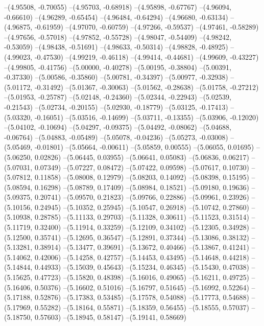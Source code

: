 --(4.95508, -0.70055)
--(4.95703, -0.68918)
--(4.95898, -0.67767)
--(4.96094, -0.66610)
--(4.96289, -0.65454)
--(4.96484, -0.64294)
--(4.96680, -0.63134)
--(4.96875, -0.61959)
--(4.97070, -0.60759)
--(4.97266, -0.59537)
--(4.97461, -0.58289)
--(4.97656, -0.57018)
--(4.97852, -0.55728)
--(4.98047, -0.54409)
--(4.98242, -0.53059)
--(4.98438, -0.51691)
--(4.98633, -0.50314)
--(4.98828, -0.48925)
--(4.99023, -0.47530)
--(4.99219, -0.46118)
--(4.99414, -0.44681)
--(4.99609, -0.43227)
--(4.99805, -0.41756)
--(5.00000, -0.40278)
--(5.00195, -0.38804)
--(5.00391, -0.37330)
--(5.00586, -0.35860)
--(5.00781, -0.34397)
--(5.00977, -0.32938)
--(5.01172, -0.31492)
--(5.01367, -0.30063)
--(5.01562, -0.28638)
--(5.01758, -0.27212)
--(5.01953, -0.25787)
--(5.02148, -0.24360)
--(5.02344, -0.22943)
--(5.02539, -0.21543)
--(5.02734, -0.20155)
--(5.02930, -0.18779)
--(5.03125, -0.17413)
--(5.03320, -0.16051)
--(5.03516, -0.14699)
--(5.03711, -0.13355)
--(5.03906, -0.12020)
--(5.04102, -0.10694)
--(5.04297, -0.09375)
--(5.04492, -0.08062)
--(5.04688, -0.06764)
--(5.04883, -0.05489)
--(5.05078, -0.04236)
--(5.05273, -0.03008)
--(5.05469, -0.01801)
--(5.05664, -0.00611)
--(5.05859, 0.00555)
--(5.06055, 0.01695)
--(5.06250, 0.02826)
--(5.06445, 0.03955)
--(5.06641, 0.05083)
--(5.06836, 0.06217)
--(5.07031, 0.07349)
--(5.07227, 0.08472)
--(5.07422, 0.09598)
--(5.07617, 0.10730)
--(5.07812, 0.11858)
--(5.08008, 0.12979)
--(5.08203, 0.14092)
--(5.08398, 0.15195)
--(5.08594, 0.16298)
--(5.08789, 0.17409)
--(5.08984, 0.18521)
--(5.09180, 0.19636)
--(5.09375, 0.20741)
--(5.09570, 0.21823)
--(5.09766, 0.22886)
--(5.09961, 0.23926)
--(5.10156, 0.24945)
--(5.10352, 0.25945)
--(5.10547, 0.26918)
--(5.10742, 0.27860)
--(5.10938, 0.28785)
--(5.11133, 0.29703)
--(5.11328, 0.30611)
--(5.11523, 0.31514)
--(5.11719, 0.32400)
--(5.11914, 0.33259)
--(5.12109, 0.34102)
--(5.12305, 0.34928)
--(5.12500, 0.35741)
--(5.12695, 0.36547)
--(5.12891, 0.37344)
--(5.13086, 0.38132)
--(5.13281, 0.38914)
--(5.13477, 0.39691)
--(5.13672, 0.40466)
--(5.13867, 0.41241)
--(5.14062, 0.42006)
--(5.14258, 0.42757)
--(5.14453, 0.43495)
--(5.14648, 0.44218)
--(5.14844, 0.44933)
--(5.15039, 0.45643)
--(5.15234, 0.46345)
--(5.15430, 0.47038)
--(5.15625, 0.47723)
--(5.15820, 0.48398)
--(5.16016, 0.49065)
--(5.16211, 0.49725)
--(5.16406, 0.50376)
--(5.16602, 0.51016)
--(5.16797, 0.51645)
--(5.16992, 0.52264)
--(5.17188, 0.52876)
--(5.17383, 0.53485)
--(5.17578, 0.54088)
--(5.17773, 0.54688)
--(5.17969, 0.55282)
--(5.18164, 0.55871)
--(5.18359, 0.56455)
--(5.18555, 0.57037)
--(5.18750, 0.57603)
--(5.18945, 0.58147)
--(5.19141, 0.58669)
